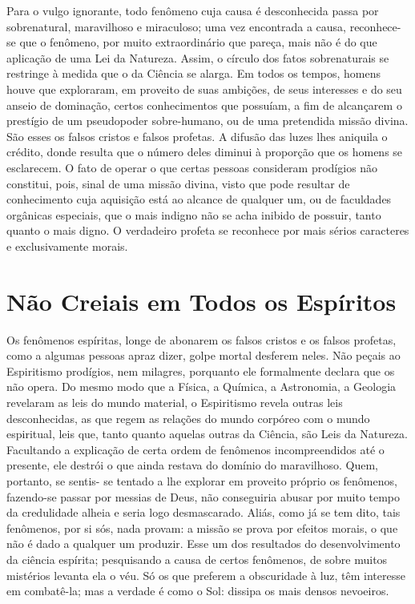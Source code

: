 \emdash{}Para o vulgo ignorante, todo fenômeno cuja causa é desconhecida passa por sobrenatural, maravilhoso e miraculoso; uma vez encontrada a causa, reconhece-se que o fenômeno, por muito extraordinário que pareça, mais não é do que aplicação de uma Lei da Natureza. Assim, o círculo dos fatos sobrenaturais se restringe à medida que o da Ciência se alarga. Em todos os tempos, homens houve que exploraram, em proveito de suas ambições, de seus interesses e do seu anseio de dominação, certos conhecimentos que possuíam, a fim de alcançarem o prestígio de um pseudopoder sobre-humano, ou de uma pretendida missão divina. São esses os falsos cristos e falsos profetas. A difusão das luzes lhes aniquila o crédito, donde resulta que o número deles diminui à proporção que os homens se esclarecem. O fato de operar o que certas pessoas consideram prodígios não constitui, pois, sinal de uma missão divina, visto que pode resultar de conhecimento cuja aquisição está ao alcance de qualquer um, ou de faculdades orgânicas especiais, que o mais indigno não se acha inibido de possuir, tanto quanto o mais digno. O verdadeiro profeta se reconhece por mais sérios caracteres e exclusivamente morais.

\section{Não Creiais em Todos os Espíritos}

\emdash{}Os fenômenos espíritas, longe de abonarem os falsos cristos e os
falsos profetas, como a algumas pessoas apraz dizer, golpe mortal desferem
neles. Não peçais ao Espiritismo prodígios, nem milagres, porquanto ele
formalmente declara que os não opera. Do mesmo modo que a Física, a Química, a Astronomia, a Geologia revelaram as leis do mundo material,
o Espiritismo revela outras leis desconhecidas, as que regem as relações do
mundo corpóreo com o mundo espiritual, leis que, tanto quanto aquelas outras da Ciência, são Leis da Natureza. Facultando a explicação de
certa ordem de fenômenos incompreendidos até o presente, ele destrói o
que ainda restava do domínio do maravilhoso. Quem, portanto, se sentis-
se tentado a lhe explorar em proveito próprio os fenômenos, fazendo-se
passar por messias de Deus, não conseguiria abusar por muito tempo da
credulidade alheia e seria logo desmascarado. Aliás, como já se tem dito,
tais fenômenos, por si sós, nada provam: a missão se prova por efeitos
morais, o que não é dado a qualquer um produzir. Esse um dos resultados
do desenvolvimento da ciência espírita; pesquisando a causa de certos fenômenos, de sobre muitos mistérios levanta ela o véu. Só os que preferem
a obscuridade à luz, têm interesse em combatê-la; mas a verdade é como o
Sol: dissipa os mais densos nevoeiros.

